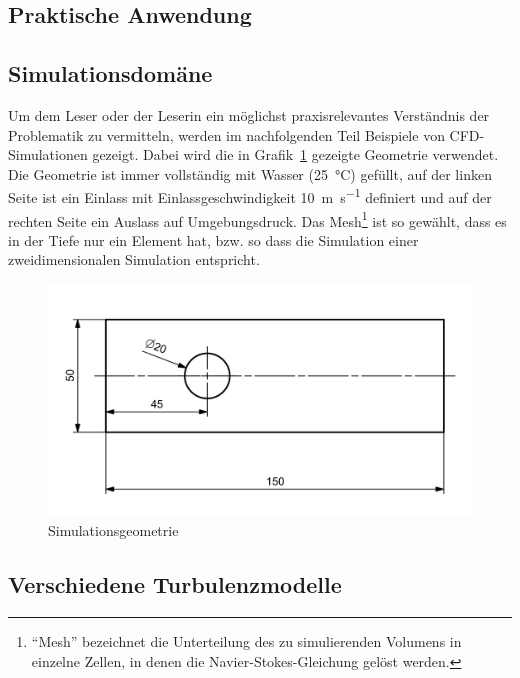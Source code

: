 \begin{refsection}



\section{Praktische Anwendung}

\subsection{Simulationsdomäne}
\label{subsubsec:domain-desc}

Um dem Leser oder der Leserin ein möglichst praxisrelevantes Verständnis der Problematik zu vermitteln, werden
im nachfolgenden Teil Beispiele von CFD-Simulationen gezeigt.
Dabei wird die in Grafik~\ref{fig:SimDomain} gezeigte Geometrie verwendet.
Die Geometrie ist immer vollständig mit Wasser (\SI{25}{\degreeCelsius}) gefüllt,
auf der linken Seite ist ein Einlass mit Einlassgeschwindigkeit \SI{10}{\meter\per\second} definiert und
auf der rechten Seite ein Auslass auf Umgebungsdruck.
Das Mesh\footnote{``Mesh'' bezeichnet die Unterteilung des zu simulierenden Volumens in einzelne Zellen,
in denen die Navier-Stokes-Gleichung gelöst werden.} ist so gewählt, dass es in der Tiefe nur ein Element hat,
bzw. so dass die Simulation einer zweidimensionalen Simulation entspricht.

\begin{figure}
    \includegraphics[width=\textwidth]{papers/reynolds/images/domain.png}
    \caption{Simulationsgeometrie}
    \label{fig:SimDomain}
\end{figure}

\subsection{Verschiedene Turbulenzmodelle}


\end{refsection}
